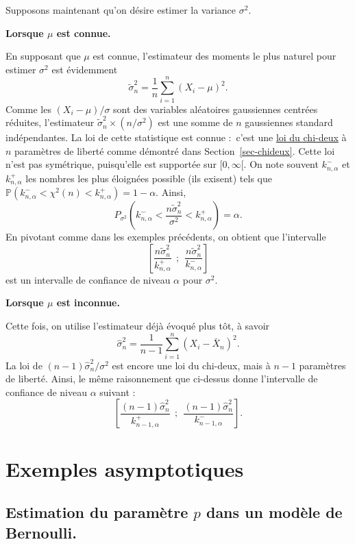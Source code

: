 \documentclass[
  10,
  letterpaper,
  DIV=11,
  numbers=noendperiod]{scrreport}
\theoremstyle{plain}
\theoremstyle{definition}
\theoremstyle{plain}
\theoremstyle{definition}
\theoremstyle{definition}
\theoremstyle{plain}
\theoremstyle{remark}
\begin{document}
Supposons maintenant qu'on désire estimer la variance \(\sigma^2\).

\textbf{Lorsque \(\mu\) est connue.}

En supposant que \(\mu\) est connue, l'estimateur des moments le plus
naturel pour estimer \(\sigma^2\) est évidemment
\[ \tilde{\sigma}^2_n = \frac{1}{n}\sum_{i=1}^n (X_i - \mu)^2.\] Comme
les \((X_i - \mu)/\sigma\) sont des variables aléatoires gaussiennes
centrées réduites, l'estimateur
\(\tilde{\sigma}^2_n \times (n/ \sigma^2)\) est une somme de \(n\)
gaussiennes standard indépendantes. La loi de cette statistique est
connue :~c'est une
\href{https://fr.wikipedia.org/wiki/Loi_du_\%CF\%87\%C2\%B2}{loi du
chi-deux} à \(n\) paramètres de liberté comme démontré dans
Section~\ref{sec-chideux}. Cette loi n'est pas symétrique, puisqu'elle
est supportée sur \([0,\infty[\). On note souvent \(k^-_{n,\alpha}\) et
\(k^+_{n,\alpha}\) les nombres les plus éloignées possible (ils exisent)
tels que
\(\mathbb{P}(k^-_{n,\alpha}< \chi^2(n)<k^+_{n,\alpha}) = 1-\alpha\).
Ainsi,
\[P_{\sigma^2}(k^-_{n,\alpha}< \frac{n \tilde{\sigma}^2_n}{\sigma^2} < k^+_{n,\alpha}) = \alpha.\]
En pivotant comme dans les exemples précédents, on obtient que
l'intervalle
\[\left[\frac{n\tilde{\sigma}_n^2}{k^{+}_{n,\alpha}} ~~;~~ \frac{n\tilde{\sigma}_n^2}{k^-_{n,\alpha}} \right] \]
est un intervalle de confiance de niveau \(\alpha\) pour \(\sigma^2\).

\textbf{Lorsque \(\mu\) est inconnue.}

Cette fois, on utilise l'estimateur déjà évoqué plus tôt, à savoir
\[ \hat{\sigma}_n^2 = \frac{1}{n-1}\sum_{i=1}^n (X_i - \bar{X}_n)^2.\]
La loi de \((n-1)\hat{\sigma}^2_n / \sigma^2\) est encore une loi du
chi-deux, mais à \(n-1\) paramètres de liberté. Ainsi, le même
raisonnement que ci-dessus donne l'intervalle de confiance de niveau
\(\alpha\) suivant :~
\[\left[\frac{(n-1)\hat{\sigma}_n^2}{k^+_{n-1,\alpha}} ~~;~~ \frac{(n-1)\hat{\sigma}_n^2}{k^-_{n-1,\alpha}} \right]. \]

\hypertarget{exemples-asymptotiques}{%
\section{Exemples asymptotiques}\label{exemples-asymptotiques}}

\hypertarget{sec-icber}{%
\subsection{\texorpdfstring{Estimation du paramètre \(p\) dans un modèle
de
Bernoulli.}{Estimation du paramètre p dans un modèle de Bernoulli.}}\label{sec-icber}}
\end{document}

